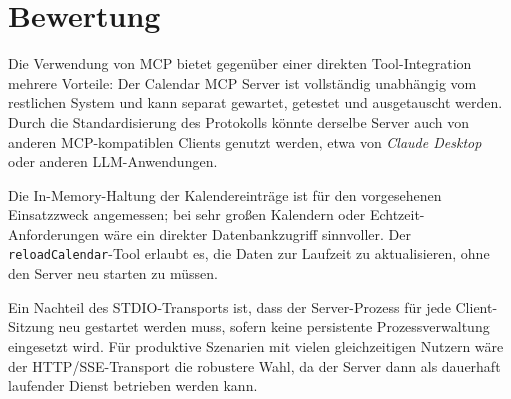 \section{Bewertung}

Die Verwendung von MCP bietet gegenüber einer direkten Tool-Integration
mehrere Vorteile: Der Calendar MCP Server ist vollständig unabhängig vom restlichen
System und kann separat gewartet, getestet und ausgetauscht werden. Durch die
Standardisierung des Protokolls könnte derselbe Server auch
von anderen MCP-kompatiblen Clients genutzt werden, etwa von \emph{Claude Desktop}
oder anderen LLM-Anwendungen.

Die In-Memory-Haltung der Kalendereinträge ist für den vorgesehenen Einsatzzweck
angemessen; bei sehr großen Kalendern oder Echtzeit-Anforderungen wäre ein direkter
Datenbankzugriff sinnvoller. Der \texttt{reloadCalendar}-Tool erlaubt es,
die Daten zur Laufzeit zu aktualisieren, ohne den Server neu starten zu müssen.

Ein Nachteil des STDIO-Transports ist, dass der Server-Prozess für jede Client-Sitzung
neu gestartet werden muss, sofern keine persistente Prozessverwaltung eingesetzt wird.
Für produktive Szenarien mit vielen gleichzeitigen Nutzern wäre der HTTP/SSE-Transport
die robustere Wahl, da der Server dann als dauerhaft laufender Dienst betrieben werden
kann.
